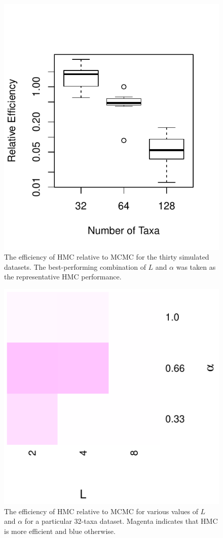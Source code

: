 \documentclass{article}
\begin{document}
    \begin{figure}
        \centering
        \includegraphics[scale=0.8]{boxplot.pdf}
        \caption{The efficiency of \ac{HMC} relative to \ac{MCMC} for the
                 thirty simulated datasets. The best-performing combination of
                 $L$ and $\alpha$ was taken as the representative \ac{HMC}
                 performance.}
    \end{figure}
    \begin{figure}
        \centering
        \includegraphics[scale=0.8]{heatmap.pdf}
        \caption{The efficiency of \ac{HMC} relative to \ac{MCMC} for various
                 values of $L$ and $\alpha$ for a particular 32-taxa dataset.
                 Magenta indicates that \ac{HMC} is more efficient and blue
                 otherwise.}
    \end{figure}

    \printbibliography
\end{document}
